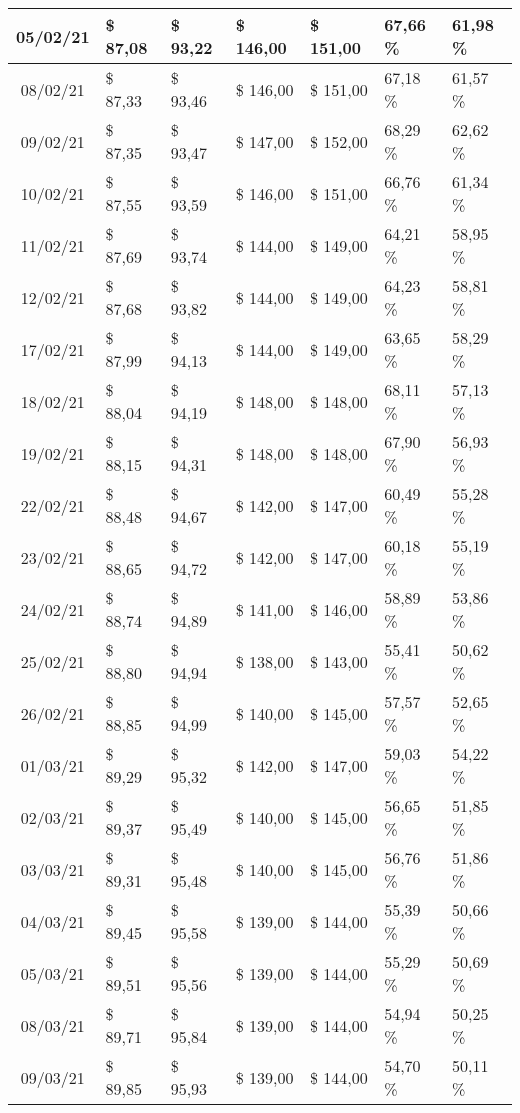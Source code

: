 \begin{center}
\begin{longtable}{|c|p{1.5cm}|p{1.5cm}|p{1.5cm}|p{1.5cm}|p{1.5cm}|p{1.5cm}|}
05/02/21 & \$ 87,08 & \$ 93,22 & \$ 146,00 & \$ 151,00 & 67,66 \% & 61,98 \% \\ \hline
08/02/21 & \$ 87,33 & \$ 93,46 & \$ 146,00 & \$ 151,00 & 67,18 \% & 61,57 \% \\ \hline
09/02/21 & \$ 87,35 & \$ 93,47 & \$ 147,00 & \$ 152,00 & 68,29 \% & 62,62 \% \\ \hline
10/02/21 & \$ 87,55 & \$ 93,59 & \$ 146,00 & \$ 151,00 & 66,76 \% & 61,34 \% \\ \hline
11/02/21 & \$ 87,69 & \$ 93,74 & \$ 144,00 & \$ 149,00 & 64,21 \% & 58,95 \% \\ \hline
12/02/21 & \$ 87,68 & \$ 93,82 & \$ 144,00 & \$ 149,00 & 64,23 \% & 58,81 \% \\ \hline
17/02/21 & \$ 87,99 & \$ 94,13 & \$ 144,00 & \$ 149,00 & 63,65 \% & 58,29 \% \\ \hline
18/02/21 & \$ 88,04 & \$ 94,19 & \$ 148,00 & \$ 148,00 & 68,11 \% & 57,13 \% \\ \hline
19/02/21 & \$ 88,15 & \$ 94,31 & \$ 148,00 & \$ 148,00 & 67,90 \% & 56,93 \% \\ \hline
22/02/21 & \$ 88,48 & \$ 94,67 & \$ 142,00 & \$ 147,00 & 60,49 \% & 55,28 \% \\ \hline
23/02/21 & \$ 88,65 & \$ 94,72 & \$ 142,00 & \$ 147,00 & 60,18 \% & 55,19 \% \\ \hline
24/02/21 & \$ 88,74 & \$ 94,89 & \$ 141,00 & \$ 146,00 & 58,89 \% & 53,86 \% \\ \hline
25/02/21 & \$ 88,80 & \$ 94,94 & \$ 138,00 & \$ 143,00 & 55,41 \% & 50,62 \% \\ \hline
26/02/21 & \$ 88,85 & \$ 94,99 & \$ 140,00 & \$ 145,00 & 57,57 \% & 52,65 \% \\ \hline
01/03/21 & \$ 89,29 & \$ 95,32 & \$ 142,00 & \$ 147,00 & 59,03 \% & 54,22 \% \\ \hline
02/03/21 & \$ 89,37 & \$ 95,49 & \$ 140,00 & \$ 145,00 & 56,65 \% & 51,85 \% \\ \hline
03/03/21 & \$ 89,31 & \$ 95,48 & \$ 140,00 & \$ 145,00 & 56,76 \% & 51,86 \% \\ \hline
04/03/21 & \$ 89,45 & \$ 95,58 & \$ 139,00 & \$ 144,00 & 55,39 \% & 50,66 \% \\ \hline
05/03/21 & \$ 89,51 & \$ 95,56 & \$ 139,00 & \$ 144,00 & 55,29 \% & 50,69 \% \\ \hline
08/03/21 & \$ 89,71 & \$ 95,84 & \$ 139,00 & \$ 144,00 & 54,94 \% & 50,25 \% \\ \hline
09/03/21 & \$ 89,85 & \$ 95,93 & \$ 139,00 & \$ 144,00 & 54,70 \% & 50,11 \% \\ \hline

\end{longtable}
\end{center}
